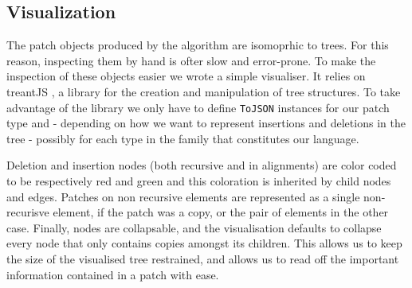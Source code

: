 \documentclass[11pt, titlepage]{article}
\begin{document}
 

\subsection{Visualization}\label{viz}

The patch objects produced by the algorithm are isomoprhic to trees. For this 
reason, inspecting them by hand is ofter slow and error-prone. To make the 
inspection of these objects easier we wrote a simple visualiser. 
It relies on treantJS \cite{treant}, a library for the creation and manipulation 
of tree structures. To take advantage of the library we only have to define 
\texttt{ToJSON} instances for our patch type and - depending on how we want to 
represent insertions and deletions in the tree - possibly for each type in the family that constitutes our language.

Deletion and insertion nodes (both recursive and in alignments) are color coded 
to be respectively red and green and this coloration is inherited by child nodes 
and edges. 
Patches on non recursive elements are represented as a single non-recurisve 
element, if the patch was a copy, or the pair of elements in the other case. 
Finally, nodes are collapsable, and the visualisation defaults to collapse every 
node that only contains copies amongst its children. This allows us to keep the 
size of the visualised tree restrained, and allows us to read off the important 
information contained in a patch with ease.
\end{document}

